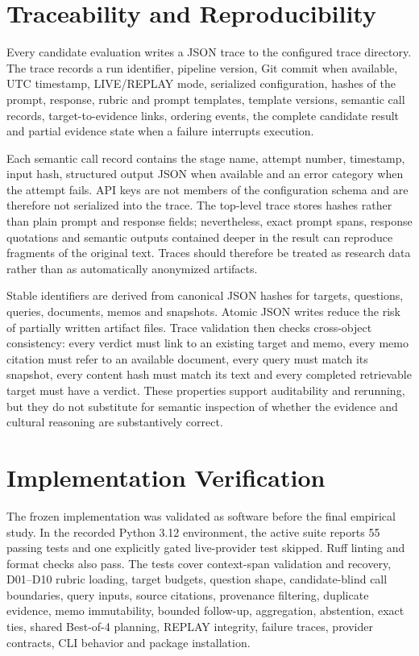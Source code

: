 \section{Traceability and Reproducibility}
\label{sec:traceability}

Every candidate evaluation writes a JSON trace to the configured trace directory. The trace records a run identifier, pipeline version, Git commit when available, UTC timestamp, LIVE/REPLAY mode, serialized configuration, hashes of the prompt, response, rubric and prompt templates, template versions, semantic call records, target-to-evidence links, ordering events, the complete candidate result and partial evidence state when a failure interrupts execution.

Each semantic call record contains the stage name, attempt number, timestamp, input hash, structured output JSON when available and an error category when the attempt fails. API keys are not members of the configuration schema and are therefore not serialized into the trace. The top-level trace stores hashes rather than plain prompt and response fields; nevertheless, exact prompt spans, response quotations and semantic outputs contained deeper in the result can reproduce fragments of the original text. Traces should therefore be treated as research data rather than as automatically anonymized artifacts.

Stable identifiers are derived from canonical JSON hashes for targets, questions, queries, documents, memos and snapshots. Atomic JSON writes reduce the risk of partially written artifact files. Trace validation then checks cross-object consistency: every verdict must link to an existing target and memo, every memo citation must refer to an available document, every query must match its snapshot, every content hash must match its text and every completed retrievable target must have a verdict. These properties support auditability and rerunning, but they do not substitute for semantic inspection of whether the evidence and cultural reasoning are substantively correct.

\section{Implementation Verification}
\label{sec:implementation-verification}

The frozen implementation was validated as software before the final empirical study. In the recorded Python 3.12 environment, the active suite reports 55 passing tests and one explicitly gated live-provider test skipped. Ruff linting and format checks also pass. The tests cover context-span validation and recovery, D01--D10 rubric loading, target budgets, question shape, candidate-blind call boundaries, query inputs, source citations, provenance filtering, duplicate evidence, memo immutability, bounded follow-up, aggregation, abstention, exact ties, shared Best-of-4 planning, REPLAY integrity, failure traces, provider contracts, CLI behavior and package installation.


